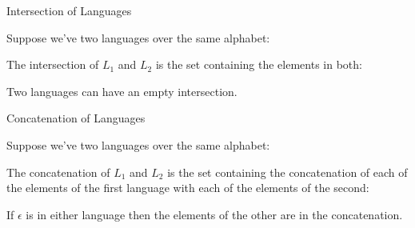 \documentclass{beamer}
\begin{document}
\begin{frame}{Intersection of Languages}

  \vspace{2mm}

  Suppose we've two languages over the same alphabet:


  

  \vspace{2mm}

  The intersection of $L_1$ and $L_2$ is the set containing the elements in both:


  \vspace{2mm}

  Two languages can have an empty intersection.

\end{frame}

\begin{frame}{Concatenation of Languages}

  \vspace{2mm}

  Suppose we've two languages over the same alphabet:


  

  \vspace{2mm}

  The concatenation of $L_1$ and $L_2$ is the set containing the concatenation of each of the elements of the first language with each of the elements of the second:


  \vspace{2mm}

  If $\epsilon$ is in either language then the elements of the other are in the concatenation.

\end{frame}
\end{document}
